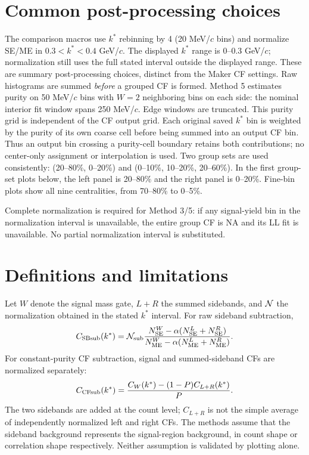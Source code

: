 \documentclass[11pt,a4paper]{article}
\begin{document}
\section{Common post-processing choices}
The comparison macros use $k^*$ rebinning by 4 (20 MeV/$c$ bins) and normalize SE/ME in $0.3<k^*<0.4$ GeV/$c$. The displayed $k^*$ range is $0$--$0.3$ GeV/$c$; normalization still uses the full stated interval outside the displayed range. These are summary post-processing choices, distinct from the Maker CF settings. Raw histograms are summed \emph{before} a grouped CF is formed.
Method 5 estimates purity on 50 MeV/$c$ bins with $W=2$ neighboring bins on each side: the nominal interior fit window spans 250 MeV/$c$. Edge windows are truncated. This purity grid is independent of the CF output grid. Each original saved $k^*$ bin is weighted by the purity of its own coarse cell before being summed into an output CF bin. Thus an output bin crossing a purity-cell boundary retains both contributions; no center-only assignment or interpolation is used.
Two group sets are used consistently: (20--80\%, 0--20\%) and (0--10\%, 10--20\%, 20--60\%). In the first group-set plots below, the left panel is 20--80\% and the right panel is 0--20\%. Fine-bin plots show all nine centralities, from 70--80\% to 0--5\%.
\par Complete normalization is required for Method 3/5: if any signal-yield bin in the normalization interval is unavailable, the entire group CF is NA and its LL fit is unavailable. No partial normalization interval is substituted.
\clearpage\section{Definitions and limitations}
Let $W$ denote the signal mass gate, $L+R$ the summed sidebands, and ${\cal N}$ the normalization obtained in the stated $k^*$ interval. For raw sideband subtraction,
\begin{equation}C_{\rm SBsub}(k^*)={\cal N}_{\rm sub}\frac{N_{\rm SE}^{W}-\alpha(N_{\rm SE}^{L}+N_{\rm SE}^{R})}{N_{\rm ME}^{W}-\alpha(N_{\rm ME}^{L}+N_{\rm ME}^{R})}.\end{equation}
For constant-purity CF subtraction, signal and summed-sideband CFs are normalized separately:
\begin{equation}C_{\rm CFsub}(k^*)=\frac{C_W(k^*)-(1-P)C_{L+R}(k^*)}{P}.\end{equation}
The two sidebands are added at the count level; $C_{L+R}$ is not the simple average of independently normalized left and right CFs. The methods assume that the sideband background represents the signal-region background, in count shape or correlation shape respectively. Neither assumption is validated by plotting alone.
\end{document}
